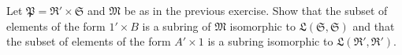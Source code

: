 Let $\mathfrak{P} = \mathfrak{R}' \times \mathfrak{S}$ and $\mathfrak{M}$ be as in the previous exercise. Show that the subset of elements of the form $1' \times B$ is a subring of $\mathfrak{M}$ isomorphic to $\mathfrak{L}(\mathfrak{S}, \mathfrak{S})$ and that the subset of elements of the form $A' \times 1$ is a subring isomorphic to $\mathfrak{L}(\mathfrak{R}', \mathfrak{R}')$.

